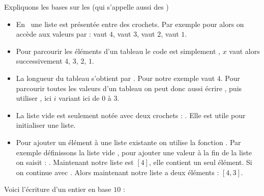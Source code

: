 \documentclass[class=report,crop=false]{standalone}
\begin{document}
Expliquons les bases sur les  (qui s'appelle aussi des )
\begin{itemize}

  \item En \Python\ une liste est présentée entre des crochets.
  Par exemple pour  alors on accède aux valeurs par  :
   vaut $4$,   vaut $3$,    vaut $2$,   vaut $1$.

  \item Pour parcourir les éléments d'un tableau le code est simplement ,
  $x$ vaut alors successivement $4$, $3$, $2$, $1$.

  \item La longueur du tableau s'obtient par . Pour notre exemple
   vaut $4$. Pour parcourir toutes les valeurs d'un tableau on peut donc aussi écrire
  , puis utiliser , ici $i$ variant ici de $0$ à $3$.

  \item La liste vide est seulement notée avec deux crochets : \codeinline{[]}. Elle est utile pour initialiser une liste.

  \item Pour ajouter un élément à une liste  existante on utilise
  la fonction . Par exemple définissons la liste vide ,
  pour ajouter une valeur à la fin de la liste on saisit : . Maintenant notre liste
  est $[4]$, elle contient un seul élément. Si on continue avec . Alors maintenant
  notre liste a deux éléments : $[4,3]$.
\end{itemize}

Voici l'écriture d'un entier en base $10$ :
\end{document}
